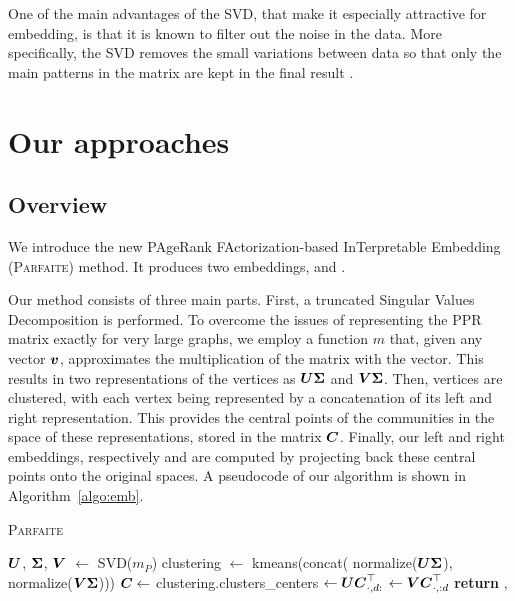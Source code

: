 One of the main advantages of the SVD, that make it especially attractive for embedding, is that it is known to filter out the noise in the data. More specifically, the SVD removes the small variations between data so that only the main patterns in the matrix are kept in the final result \cite{SVD_filtering_data}.

\section{Our approaches}\label{sec:approach}
\subsection{Overview} \label{subsec:overview}
We introduce the new PAgeRank FActorization-based InTerpretable Embedding (\textsc{Parfaite}) method. It produces two embeddings, \newembLeft and \newembRight.

Our method consists of three main parts. First, a truncated Singular Values Decomposition is performed. %
To overcome the issues of
representing the PPR matrix exactly for very large graphs, we employ a function $m$ that, given any vector $\boldsymbol{v}$, approximates the multiplication of the matrix with the vector. This results in two representations of the vertices as $\boldsymbol{U}\boldsymbol{\Sigma}$ and $\boldsymbol{V}\boldsymbol{\Sigma}$. Then, vertices are clustered, with each vertex being represented by a concatenation of its left and right representation. This provides the central points of the communities in the space of these representations, stored in the matrix $\boldsymbol{C}$. Finally, our left and right embeddings, respectively \newembLeft and \newembRight are computed by projecting back these central points onto the original spaces. A pseudocode of our algorithm is shown in Algorithm~\ref{algo:emb}. 

\begin{algorithm}
    \caption{\textsc{Parfaite}}\label{algo:emb}
    \begin{algorithmic}[1]
    \State $\boldsymbol{U}$, $\boldsymbol{\Sigma}$, $\boldsymbol{V}$ $\gets$ SVD($m_P$)
    \State clustering $\gets$ kmeans(concat( normalize($\boldsymbol{U}\boldsymbol{\Sigma}$), normalize($\boldsymbol{V}\boldsymbol{\Sigma}$)))
    \State $\boldsymbol{C} \gets$ clustering.clusters\_centers
    \State \newembLeft $ \gets \boldsymbol{U}\boldsymbol{C}_{\cdot, d:}^\top$
    \State\newembRight $ \gets \boldsymbol{V}\boldsymbol{C}_{\cdot, :d}^\top$
    \State \textbf{return} \newembLeft, \newembRight
    \EndProcedure
    \end{algorithmic}
\end{algorithm}

